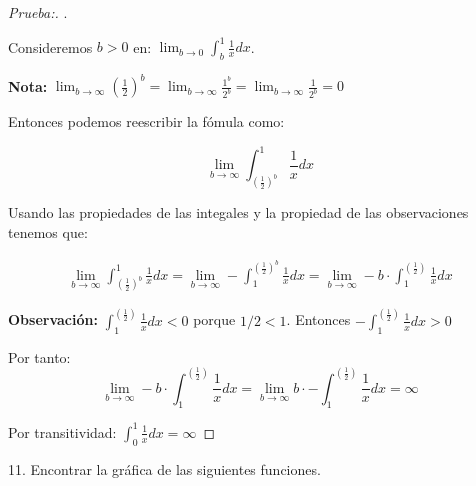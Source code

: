 \documentclass[12pt]{article}
\begin{document}
\begin{proof}[Prueba:]
    . \medskip

    Consideremos $b>0$ en: \(\displaystyle\lim_{b\to0}\int_b^1\frac{1}{x}dx\).\medskip

    \textbf{Nota:} \(\displaystyle\lim_{b\to\infty}\left(\frac{1}{2}\right)^b = \lim_{b\to\infty} \frac{1^b}{2^b} = \lim_{b\to\infty} \frac{1}{2^b} = 0\)\bigskip

    Entonces podemos reescribir la f\'omula como:

    \[\lim_{b\to\infty}\int_{\left(\frac{1}{2}\right)^b}^1\frac{1}{x}dx\]

    Usando las propiedades de las integales y la propiedad de las observaciones tenemos que:

    \begin{align*}
        \lim_{b\to\infty}\int_{\left(\frac{1}{2}\right)^b}^1\frac{1}{x}dx = \lim_{b\to\infty}-\int^{\left(\frac{1}{2}\right)^b}_1\frac{1}{x}dx = \lim_{b\to\infty}-b\cdot\int^{\left(\frac{1}{2}\right)}_1\frac{1}{x}dx
    \end{align*}

    \textbf{Observaci\'on:} \(\displaystyle\int^{\left(\frac{1}{2}\right)}_1\frac{1}{x}dx <0\) porque \(1/2<1\). Entonces \(\displaystyle-\int^{\left(\frac{1}{2}\right)}_1\frac{1}{x}dx >0\)\bigskip

    Por tanto:
    \[\lim_{b\to\infty}-b\cdot \int^{\left(\frac{1}{2}\right)}_1\frac{1}{x}dx  = \lim_{b\to\infty}b\cdot -\int^{\left(\frac{1}{2}\right)}_1\frac{1}{x}dx = \infty\]

    Por transitividad: \qquad \(\displaystyle\int_0^1\frac{1}{x}dx = \infty\)\medskip

\end{proof}

11. Encontrar la gr\'afica de las siguientes funciones.
\end{document}

